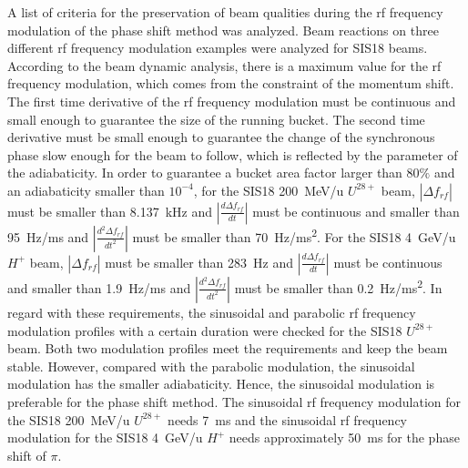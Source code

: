 A list of criteria for the preservation of beam qualities during the rf frequency modulation of the phase shift method was analyzed. Beam reactions on three different rf frequency modulation examples were analyzed for SIS18 beams. According to the beam dynamic analysis, there is a maximum value for the rf frequency modulation, which comes from the constraint of the momentum shift. The first time derivative of the rf frequency modulation must be continuous and small enough to guarantee the size of the running bucket. The second time derivative must be small enough to guarantee the change of the synchronous phase slow enough for the beam to follow, which is reflected by the parameter of the adiabaticity. In order to guarantee a bucket area factor larger than $80\%$ and an adiabaticity smaller than $10^{-4}$, for the SIS18 \SI{200}{MeV/u} $U^{28+}$ beam, $|\Delta f_{\mathit{rf}}|$ must be smaller than \SI{8.137}{kHz} and $|\frac{d\Delta f_{\mathit{rf}}}{dt}|$ must be continuous and smaller than \SI{95}{Hz/ms} and $|\frac{d^2\Delta f_{\mathit{rf}}}{dt^2}|$ must be smaller than \SI{70}{Hz/ms^2}. For the SIS18 \SI{4}{GeV/u} $H^{+}$ beam, $|\Delta f_{\mathit{rf}}|$ must be smaller than \SI{283}{Hz} and $|\frac{d\Delta f_{\mathit{rf}}}{dt}|$ must be continuous and smaller than \SI{1.9}{Hz/ms} and $|\frac{d^2\Delta f_{\mathit{rf}}}{dt^2}|$ must be smaller than \SI{0.2}{Hz/ms^2}.  In regard with these requirements, the sinusoidal and parabolic rf frequency modulation profiles with a certain duration were checked for the SIS18 $U^{28+}$ beam. Both two modulation profiles meet the requirements and keep the beam stable. However, compared with the parabolic modulation, the sinusoidal modulation has the smaller adiabaticity. Hence, the sinusoidal modulation is preferable for the phase shift method. The sinusoidal rf frequency modulation for the SIS18 \SI{200}{MeV/u} $U^{28+}$ needs \SI{7}{\ms} and the sinusoidal rf frequency modulation for the SIS18 \SI{4}{GeV/u} $H^{+}$ needs approximately \SI{50}{\ms} for the phase shift of $\pi$. 

